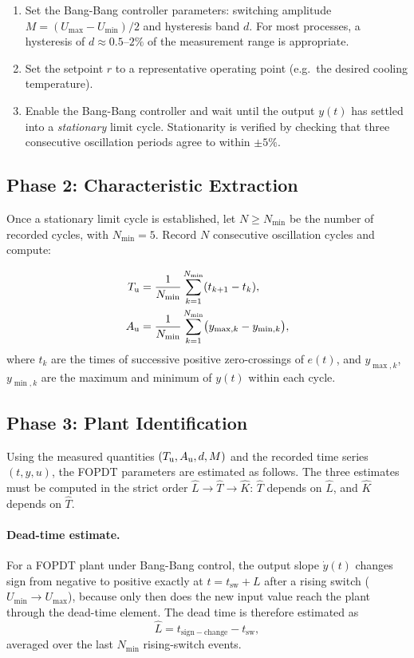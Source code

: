 \begin{enumerate}
    \item Set the Bang-Bang controller parameters:
          switching amplitude $M = (U_{\max} - U_{\min})/2$ and hysteresis
          band $d$.
          For most processes, a hysteresis of $d \approx 0.5\text{--}2\%$ of
          the measurement range is appropriate.
    \item Set the setpoint $r$ to a representative operating point
          (e.g.\ the desired cooling temperature).
    \item Enable the Bang-Bang controller and wait until the output $y(t)$
          has settled into a \emph{stationary} limit cycle.
          Stationarity is verified by checking that three consecutive
          oscillation periods agree to within $\pm 5\%$.
\end{enumerate}

\subsection{Phase 2: Characteristic Extraction}
\label{sec:method:phase2}

Once a stationary limit cycle is established, let $N \geq N_{\min}$ be the
number of recorded cycles, with $N_{\min} = 5$.
Record $N$ consecutive oscillation cycles and compute:

\begin{align}
    T_{\mathrm{u}} &= \frac{1}{N_{\min}} \sum_{k=1}^{N_{\min}} (t_{k+1} - t_k), \label{eq:Tu_est} \\
    A_{\mathrm{u}} &= \frac{1}{N_{\min}} \sum_{k=1}^{N_{\min}} \bigl(y_{\max,k} - y_{\min,k}\bigr), \label{eq:Au_est}
\end{align}
where $t_k$ are the times of successive positive zero-crossings of $e(t)$,
and $y_{\max,k}$, $y_{\min,k}$ are the maximum and minimum of $y(t)$ within
each cycle.

\subsection{Phase 3: Plant Identification}
\label{sec:method:phase3}

Using the measured quantities $(T_{\mathrm{u}}, A_{\mathrm{u}}, d, M)$ and the recorded time
series $(t, y, u)$, the FOPDT parameters are estimated as follows.
The three estimates must be computed in the strict order
$\hat{L} \to \hat{T} \to \hat{K}$: $\hat{T}$ depends on $\hat{L}$, and
$\hat{K}$ depends on $\hat{T}$.

\paragraph{Dead-time estimate.}
For a FOPDT plant under Bang-Bang control, the output slope $\dot{y}(t)$
changes sign from negative to positive exactly at $t = t_{\mathrm{sw}} + L$
after a rising switch ($U_{\min} \to U_{\max}$), because only then does the
new input value reach the plant through the dead-time element.
The dead time is therefore estimated as
\begin{equation}
    \hat{L} = t_{\mathrm{sign-change}} - t_{\mathrm{sw}},
    \label{eq:L_est}
\end{equation}
averaged over the last $N_{\min}$ rising-switch events.

